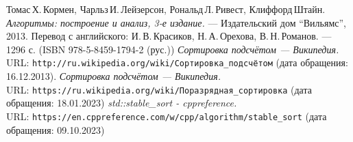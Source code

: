  
\begin{thebibliography}{99}
	Томас\,Х.\,Кормен, Чарльз\,И.\,Лейзерсон, Рональд\,Л.\,Ривест, Клиффорд\,Штайн.
	{\itshape Алгоритмы: построение и анализ, 3-е издание.} --- Издательский дом \enquote{Вильямс}, 2013. Перевод с английского: И.\,В.\,Красиков, Н.\,А.\,Орехова, В.\,Н.\,Романов. --- 1296 с. (ISBN 978-5-8459-1794-2 (рус.))
	{\itshape Сортировка подсчётом — Википедия.} \\URL: \texttt{http://ru.wikipedia.org/wiki/Сортировка\_подсчётом} (дата обращения: 16.12.2013).
	{\itshape Сортировка подсчётом — Википедия.} \\URL: \texttt{https://ru.wikipedia.org/wiki/Поразрядная\_сортировка} (дата обращения: 18.01.2023)
	{\itshape std::stable\_sort - cppreference.} \\URL: \texttt{https://en.cppreference.com/w/cpp/algorithm/stable\_sort} (дата обращения: 09.10.2023)
\end{thebibliography}
\pagebreak